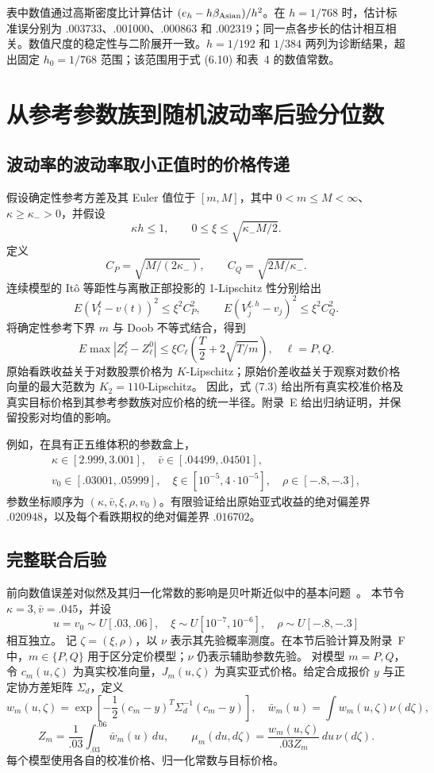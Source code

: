 表中数值通过高斯密度比计算估计 \((e_h-h\beta_{\rm Asian})/h^2\)。在 \(h=1/768\) 时，估计标准误分别为 .003733、.001000、.000863 和 .002319；同一点各步长的估计相互相关。数值尺度的稳定性与二阶展开一致。\(h=1/192\) 和 \(1/384\) 两列为诊断结果，超出固定 \(h_0=1/768\) 范围；该范围用于式 (6.10) 和表~4 的数值常数。


\section{从参考参数族到随机波动率后验分位数}

\subsection{波动率的波动率取小正值时的价格传递}

假设确定性参考方差及其 Euler 值位于 \([m,M]\)，其中 \(0<m\le M<\infty\)、\(\kappa\ge\kappa_->0\)，并假设
\[
\kappa h\le1,\qquad
0\le\xi\le\sqrt{\kappa_-M/2}.
\tag{7.1}
\]
定义
\[
C_P=\sqrt{M/(2\kappa_-)},\qquad C_Q=\sqrt{2M/\kappa_-}.
\]
连续模型的 It\^o 等距性与离散正部投影的 1-Lipschitz 性分别给出
\[
E(V_t^\xi-v(t))^2\le\xi^2C_P^2,\qquad
E(V_j^{\xi,h}-v_j)^2\le\xi^2C_Q^2.
\tag{7.2}
\]
将确定性参考下界 \(m\) 与 Doob 不等式结合，得到
\[
E\max|Z_\ell^\xi-Z_\ell^0|
\le\xi C_\ell\left(\frac T2+2\sqrt{T/m}\right),\quad \ell=P,Q.
\tag{7.3}
\]
原始看跌收益关于对数股票价格为 \(K\)-Lipschitz；原始价差收益关于观察对数价格向量的最大范数为
\(K_2=110\)-Lipschitz。
因此，式 (7.3) 给出所有真实校准价格及真实目标价格到其参考参数族对应价格的统一半径。附录~E 给出归纳证明，并保留投影对均值的影响。

例如，在具有正五维体积的参数盒上，
\[
\begin{gathered}
\kappa\in[2.999,3.001],\quad\bar v\in[.04499,.04501],\\
v_0\in[.03001,.05999],\quad \xi\in[10^{-5},4\cdot10^{-5}],
\quad\rho\in[-.8,-.3],
\end{gathered}
\tag{7.4}
\]
参数坐标顺序为 \((\kappa,\bar v,\xi,\rho,v_0)\)。有限验证给出原始亚式收益的绝对偏差界 \(.020948\)，以及每个看跌期权的绝对偏差界 \(.016702\)。

\subsection{完整联合后验}

前向数值误差对似然及其归一化常数的影响是贝叶斯近似中的基本问题~\cite{CotterDashtiStuart2010}。
本节令 \(\kappa=3,\bar v=.045\)，并设
\[
u=v_0\sim U[.03,.06],\quad
\xi\sim U[10^{-7},10^{-6}],\quad
\rho\sim U[-.8,-.3]
\tag{7.5}
\]
相互独立。
记 \(\zeta=(\xi,\rho)\)，以 \(\nu\) 表示其先验概率测度。在本节后验计算及附录~F 中，\(m\in\{P,Q\}\) 用于区分定价模型；\(\nu\) 仍表示辅助参数先验。
对模型 \(m=P,Q\)，令 \(c_m(u,\zeta)\) 为真实校准向量，\(J_m(u,\zeta)\) 为真实亚式价格。给定合成报价 \(y\) 与正定协方差矩阵 \(\Sigma_d\)，定义
\[
w_m(u,\zeta)=
\exp\!\left[-\frac12(c_m-y)^T\Sigma_d^{-1}(c_m-y)\right],
\quad \bar w_m(u)=\int w_m(u,\zeta)\nu(d\zeta),
\]
\[
Z_m=\frac1{.03}\int_{.03}^{.06}\bar w_m(u)\,du,\qquad
\mu_m(du,d\zeta)=\frac{w_m(u,\zeta)}{.03Z_m}\,du\,\nu(d\zeta).
\tag{7.6}
\]
每个模型使用各自的校准价格、归一化常数与目标价格。


